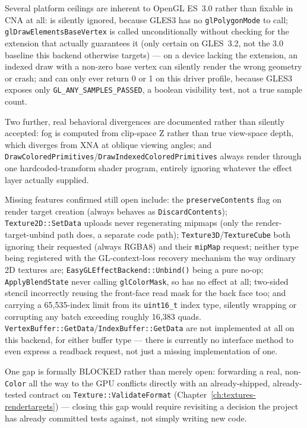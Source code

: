 Several platform ceilings are inherent to OpenGL ES~3.0 rather than fixable in CNA at all:
 is silently ignored, because GLES3 has no
\texttt{glPolygonMode} to call; \texttt{glDrawElementsBaseVertex} is called unconditionally
without checking for the extension that actually guarantees it (only certain on GLES~3.2,
not the 3.0 baseline this backend otherwise targets) --- on a device lacking the extension,
an indexed draw with a non-zero base vertex can silently render the wrong geometry or crash;
and  can only ever return 0 or 1 on this driver
profile, because GLES3 exposes only \texttt{GL\_ANY\_SAMPLES\_PASSED}, a boolean visibility
test, not a true sample count.

Two further, real behavioral divergences are documented rather than silently accepted: fog
is computed from clip-space Z rather than true view-space depth, which diverges from XNA at
oblique viewing angles; and \texttt{DrawColoredPrimitives}/\texttt{DrawIndexedColoredPrimitives}
always render through one hardcoded-transform shader program, entirely ignoring whatever
 the effect layer actually supplied.

Missing features confirmed still open include: the \texttt{preserveContents} flag on render
target creation (always behaves as \texttt{DiscardContents}); \texttt{Texture2D::SetData}
uploads never regenerating mipmaps (only the render-target-unbind path does, a separate code
path); \texttt{Texture3D}/\texttt{TextureCube} both ignoring their requested
 (always RGBA8) and their \texttt{mipMap} request; neither type being
registered with the GL-context-loss recovery mechanism the way ordinary 2D textures are;
\texttt{EasyGLEffectBackend::Unbind()} being a pure no-op; \texttt{ApplyBlendState} never
calling \texttt{glColorMask}, so  has no effect at all; two-sided
stencil incorrectly reusing the front-face read mask for the back face too; and
 carrying a 65{,}535-index limit from its \texttt{uint16\_t} index
type, silently wrapping or corrupting any batch exceeding roughly 16{,}383 quads.
\texttt{VertexBuffer::GetData}/\texttt{IndexBuffer::GetData} are not implemented at all on
this backend, for either buffer type --- there is currently no interface method to even
express a readback request, not just a missing implementation of one.

One gap is formally BLOCKED rather than merely open: forwarding a real, non-\texttt{Color}
 all the way to the GPU conflicts directly with an already-shipped,
already-tested contract on \texttt{Texture::ValidateFormat} (Chapter~\ref{ch:textures-rendertargets})
--- closing this gap would require revisiting a decision the project has already committed
tests against, not simply writing new code.

